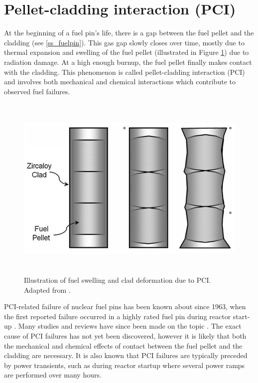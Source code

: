 \section{Pellet-cladding interaction (PCI)}

At the beginning of a fuel pin's life, there is a gap between the fuel pellet and the cladding (see \ref{ss_fuelpin}). This gas gap slowly closes over time, mostly due to thermal expansion and swelling of the fuel pellet (illustrated in Figure \ref{figure:pcmi}) due to radiation damage. At a high enough burnup, the fuel pellet finally makes contact with the cladding. This phenomenon is called pellet-cladding interaction (PCI) and involves both mechanical and chemical interactions which contribute to observed fuel failures.

\begin{figure}[htp]
\centering
\includegraphics[height=9cm]{images/pcmi.png}
\caption[Illustration of fuel swelling and clad deformation due to PCI.]{Illustration of fuel swelling and clad deformation due to PCI. Adapted from \cite{alam2011review}.}
\label{figure:pcmi}
\end{figure}

PCI-related failure of nuclear fuel pins has been known about since 1963, when the first reported failure occurred in a highly rated fuel pin during reactor start-up \cite{lyons1963high}. Many studies and reviews have since been made on the topic \cite{alam2011review, bcoxpelletclad1990}. The exact cause of PCI failures has not yet been discovered, however it is likely that both the mechanical and chemical effects of contact between the fuel pellet and the cladding are necessary. It is also known that PCI failures are typically preceded by power transients, such as during reactor startup where several power ramps are performed over many hours.

